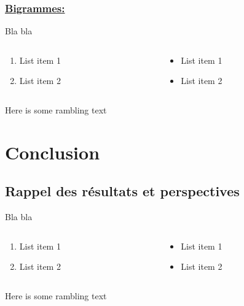 \documentclass[xcolor=dvipsnames]{beamer}
\begin{document}
	\begin{frame}
		\frametitle{\underline{Bigrammes:}}
		Bla bla 
		\begin{columns}
			\begin{column}{0.5\textwidth} %
				\begin{enumerate}
					\item List item 1
					\item List item 2
				\end{enumerate}
			\end{column}
			\begin{column}{0.5\textwidth}
				\begin{itemize}
					\item List item 1
					\item List item 2
				\end{itemize}
			\end{column}
		\end{columns}
		\vspace{\baselineskip}
		Here is some rambling text
	\end{frame}

	\section*{Conclusion}
	\subsection*{Rappel des résultats et perspectives}

	\begin{frame}
		Bla bla 
		\begin{columns}
			\begin{column}{0.5\textwidth} %
				\begin{enumerate}
					\item List item 1
					\item List item 2
				\end{enumerate}
			\end{column}
			\begin{column}{0.5\textwidth}
				\begin{itemize}
					\item List item 1
					\item List item 2
				\end{itemize}
			\end{column}
		\end{columns}
		\vspace{\baselineskip}
		Here is some rambling text
	\end{frame}
\end{document}
